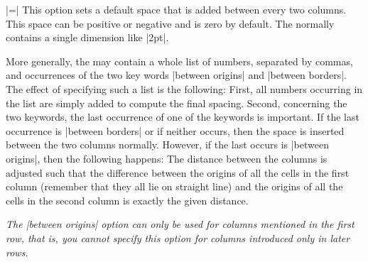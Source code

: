 \begin{itemize}
  |=|
  This option sets a default space that is added between every two
  columns. This space can be positive or negative and is zero by
  default. The  normally contains a single
  dimension like |2pt|.
\begin{codeexample}[]
\end{codeexample}
  More generally, the  may contain a whole list of
  numbers, separated by commas, and occurrences of the two key words
  |between origins| and |between borders|. The effect of specifying
  such a list is the following: First, all numbers occurring in the
  list are simply added to compute the final spacing. Second,
  concerning the two keywords, the last occurrence of one of the keywords is
  important. If the last occurrence is |between borders| or if neither
  occurs, then the space is inserted between the two columns
  normally. However, if the last occurs is |between origins|, then the 
  following happens: The distance between the columns is adjusted such
  that the difference between the origins of all the cells in the
  first column (remember that they all lie on straight line) and the
  origins of all the cells in the second column is exactly the given
  distance.

  \emph{The |between origins| option can only be used for columns
    mentioned in the first row, that is, you cannot specify this
    option for columns introduced only in later rows.}
  

\end{itemize}
